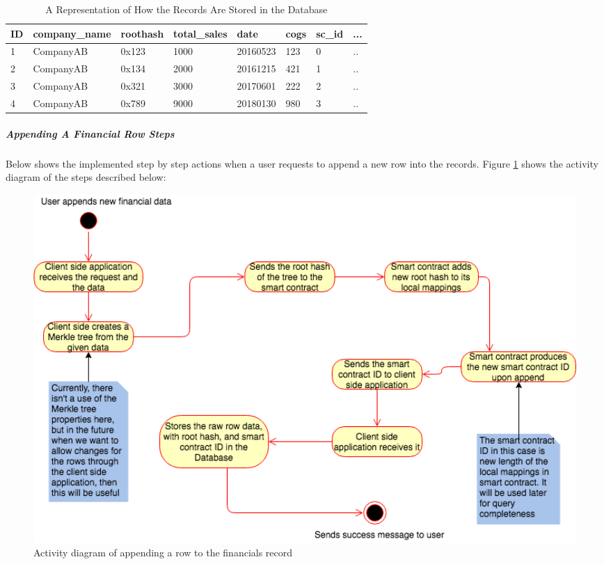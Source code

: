 \begin{table}
	\centering
	\caption{A Representation of How the Records Are Stored in the Database}
    \begin{tabular}{| l | l | l | l | l | l | l | l |}
    \hline
    ID & company\_name & roothash & total\_sales & date & cogs & sc\_id & ... \\ \hline
    1 & CompanyAB & 0x123 & 1000 & 20160523 & 123 & 0 & .. \\ \hline
    2 & CompanyAB & 0x134 & 2000 & 20161215 & 421 & 1 & .. \\ \hline
    3 & CompanyAB & 0x321 & 3000 & 20170601 & 222 & 2 & .. \\ \hline
    4 & CompanyAB & 0x789 & 9000 & 20180130 & 980 & 3 & .. \\ \hline
    \end{tabular}
	\label{table:recordsOffChain}
\end{table}

\subparagraph{Appending A Financial Row Steps}
Below shows the implemented step by step actions when a user requests to append a new row into the records. Figure \ref{fig:appendRowFinancials} shows the activity diagram of the steps described below:

\begin{figure}[h]
	\centering
	\includegraphics[width=1.0\textwidth]{images/appendRowFinancials.png}
	\caption{\label{fig:appendRowFinancials}Activity diagram of appending a row to the financials record}
\end{figure}

